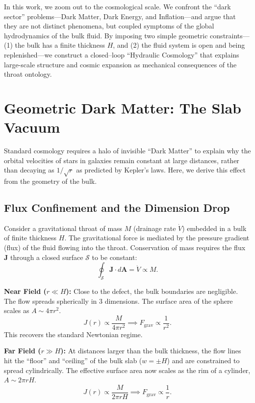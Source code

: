 \documentclass[12pt]{article}
\begin{document}
In this work, we zoom out to the cosmological scale. We confront the ``dark sector'' problems---Dark Matter, Dark Energy, and Inflation---and argue that they are not distinct phenomena, but coupled symptoms of the global hydrodynamics of the bulk fluid. By imposing two simple geometric constraints---(1) the bulk has a finite thickness $H$, and (2) the fluid system is open and being replenished---we construct a closed--loop ``Hydraulic Cosmology'' that explains large-scale structure and cosmic expansion as mechanical consequences of the throat ontology.

\section{Geometric Dark Matter: The Slab Vacuum}
\label{sec:slab_vacuum}

Standard cosmology requires a halo of invisible ``Dark Matter'' to explain why the orbital velocities of stars in galaxies remain constant at large distances, rather than decaying as $1/\sqrt{r}$ as predicted by Kepler's laws. Here, we derive this effect from the geometry of the bulk.

\subsection{Flux Confinement and the Dimension Drop}
Consider a gravitational throat of mass $M$ (drainage rate $\dot{V}$) embedded in a bulk of finite thickness $H$. The gravitational force is mediated by the pressure gradient (flux) of the fluid flowing into the throat.
Conservation of mass requires the flux $\mathbf{J}$ through a closed surface $\mathcal{S}$ to be constant:
\begin{equation}
  \oint_{\mathcal{S}} \mathbf{J} \cdot d\mathbf{A} = \dot{V} \propto M.
\end{equation}

\textbf{Near Field ($r \ll H$):}
Close to the defect, the bulk boundaries are negligible. The flow spreads spherically in 3 dimensions. The surface area of the sphere scales as $A \sim 4\pi r^2$.
\begin{equation}
  J(r) \propto \frac{M}{4\pi r^2} \implies F_{\text{grav}} \propto \frac{1}{r^2}.
\end{equation}
This recovers the standard Newtonian regime.

\textbf{Far Field ($r \gg H$):}
At distances larger than the bulk thickness, the flow lines hit the ``floor'' and ``ceiling'' of the bulk slab ($w = \pm H$) and are constrained to spread cylindrically. The effective surface area now scales as the rim of a cylinder, $A \sim 2\pi r H$.
\begin{equation}
  J(r) \propto \frac{M}{2\pi r H} \implies F_{\text{grav}} \propto \frac{1}{r}.
\end{equation}
\end{document}

